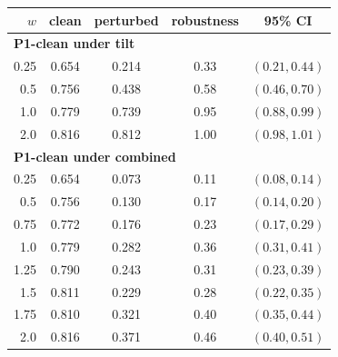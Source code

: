 \begin{tabular}{@{}r c c c c@{}}
\toprule
$w$ & clean & perturbed & robustness & 95\% CI \\
\midrule
\multicolumn{5}{l}{\textbf{P1-clean under tilt}} \\
0.25 & 0.654 & 0.214 & 0.33 & $(0.21,0.44)$ \\
0.5 & 0.756 & 0.438 & 0.58 & $(0.46,0.70)$ \\
1.0 & 0.779 & 0.739 & 0.95 & $(0.88,0.99)$ \\
2.0 & 0.816 & 0.812 & 1.00 & $(0.98,1.01)$ \\
\midrule
\multicolumn{5}{l}{\textbf{P1-clean under combined}} \\
0.25 & 0.654 & 0.073 & 0.11 & $(0.08,0.14)$ \\
0.5 & 0.756 & 0.130 & 0.17 & $(0.14,0.20)$ \\
0.75 & 0.772 & 0.176 & 0.23 & $(0.17,0.29)$ \\
1.0 & 0.779 & 0.282 & 0.36 & $(0.31,0.41)$ \\
1.25 & 0.790 & 0.243 & 0.31 & $(0.23,0.39)$ \\
1.5 & 0.811 & 0.229 & 0.28 & $(0.22,0.35)$ \\
1.75 & 0.810 & 0.321 & 0.40 & $(0.35,0.44)$ \\
2.0 & 0.816 & 0.371 & 0.46 & $(0.40,0.51)$ \\
\bottomrule
\end{tabular}
